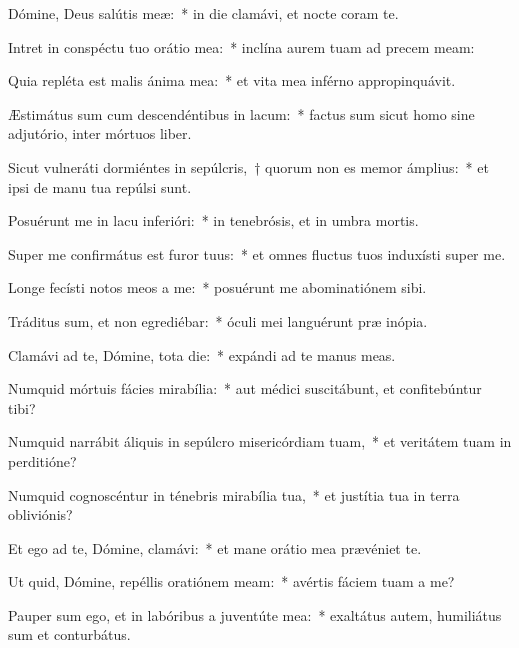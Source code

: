 \item Dómine, Deus salútis meæ:~* in die clamávi, et nocte coram te.

\item Intret in conspéctu tuo orátio mea:~* inclína aurem tuam ad precem meam:

\item Quia repléta est malis ánima mea:~* et vita mea inférno appropinquávit.

\item Æstimátus sum cum descendéntibus in lacum:~* factus sum sicut homo sine adjutório, inter mórtuos liber.

\item Sicut vulneráti dormiéntes in sepúlcris,~† quorum non es memor ámplius:~* et ipsi de manu tua repúlsi sunt.

\item Posuérunt me in lacu inferióri:~* in tenebrósis, et in umbra mortis.

\item Super me confirmátus est furor tuus:~* et omnes fluctus tuos induxísti super me.

\item Longe fecísti notos meos a me:~* posuérunt me abominatiónem sibi.

\item Tráditus sum, et non egrediébar:~* óculi mei languérunt præ inópia.

\item Clamávi ad te, Dómine, tota die:~* expándi ad te manus meas.

\item Numquid mórtuis fácies mirabília:~* aut médici suscitábunt, et confitebúntur tibi?

\item Numquid narrábit áliquis in sepúlcro misericórdiam tuam,~* et veritátem tuam in perditióne?

\item Numquid cognoscéntur in ténebris mirabília tua,~* et justítia tua in terra obliviónis?

\item Et ego ad te, Dómine, clamávi:~* et mane orátio mea prævéniet te.

\item Ut quid, Dómine, repéllis oratiónem meam:~* avértis fáciem tuam a me?

\item Pauper sum ego, et in labóribus a juventúte mea:~* exaltátus autem, humiliátus sum et conturbátus.

